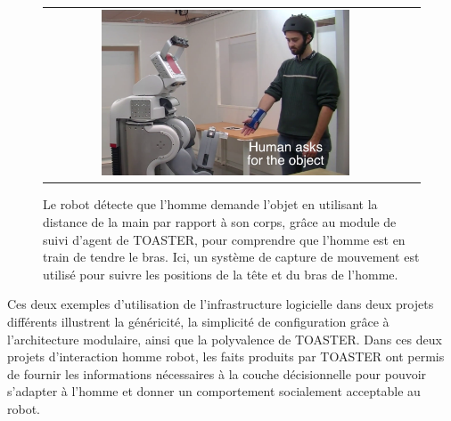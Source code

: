 \documentclass[a4paper,11pt,twoside]{StyleThese}
\begin{document}
 \begin{figure}[ht!]

 \centering
 \begin{tabular}{cc}
  \includegraphics[width=0.7\textwidth]{img/sapharishrink.png}
 \end{tabular}
 \caption{Le robot détecte que l'homme demande l'objet en utilisant la distance de la main par rapport à son corps, grâce au module de suivi d'agent de TOASTER, pour comprendre que l'homme est en train de tendre le bras. Ici, un système de capture de mouvement est utilisé pour suivre les positions de la tête et du bras de l'homme.}
 \label{fig:saphari}
 \end{figure}
 
 
 Ces deux exemples d'utilisation de l'infrastructure logicielle dans deux projets différents illustrent la généricité, la simplicité de configuration grâce à l'architecture modulaire, ainsi que la polyvalence de TOASTER. Dans ces deux projets d'interaction homme robot, les faits produits par TOASTER ont permis de fournir les informations nécessaires à la couche décisionnelle pour pouvoir s'adapter à l'homme et donner un comportement socialement acceptable au robot.

% 



\ifdefined{}
\else


\end{document}
